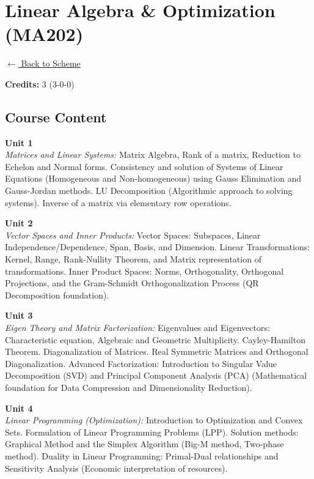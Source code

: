 \section*{Linear Algebra \& Optimization (MA202)}
\label{course:MA202}

\noindent \small{\hyperref[main:scheme]{$\leftarrow$ Back to Scheme}} \vspace{0.5cm}

\noindent \textbf{Credits:} 3 (3-0-0)

\subsection*{Course Content}
\noindent\textbf{Unit 1} \\
\textit{Matrices and Linear Systems:} Matrix Algebra, Rank of a matrix, Reduction to Echelon and Normal forms. Consistency and solution of Systems of Linear Equations (Homogeneous and Non-homogeneous) using Gauss Elimination and Gauss-Jordan methods. LU Decomposition (Algorithmic approach to solving systems). Inverse of a matrix via elementary row operations.

\vspace{0.3cm}

\noindent\textbf{Unit 2} \\
\textit{Vector Spaces and Inner Products:} Vector Spaces: Subspaces, Linear Independence/Dependence, Span, Basis, and Dimension. Linear Transformations: Kernel, Range, Rank-Nullity Theorem, and Matrix representation of transformations. Inner Product Spaces: Norms, Orthogonality, Orthogonal Projections, and the Gram-Schmidt Orthogonalization Process (QR Decomposition foundation).

\vspace{0.3cm}

\noindent\textbf{Unit 3} \\
\textit{Eigen Theory and Matrix Factorization:} Eigenvalues and Eigenvectors: Characteristic equation, Algebraic and Geometric Multiplicity. Cayley-Hamilton Theorem. Diagonalization of Matrices. Real Symmetric Matrices and Orthogonal Diagonalization. Advanced Factorization: Introduction to Singular Value Decomposition (SVD) and Principal Component Analysis (PCA) (Mathematical foundation for Data Compression and Dimensionality Reduction).

\vspace{0.3cm}

\noindent\textbf{Unit 4} \\
\textit{Linear Programming (Optimization):} Introduction to Optimization and Convex Sets. Formulation of Linear Programming Problems (LPP). Solution methods: Graphical Method and the Simplex Algorithm (Big-M method, Two-phase method). Duality in Linear Programming: Primal-Dual relationships and Sensitivity Analysis (Economic interpretation of resources).

